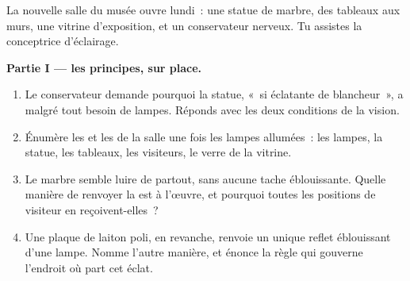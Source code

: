 \begin{problem}\label{pb:g7:light-sources-propagation:1}
La nouvelle salle du musée ouvre lundi~: une statue de marbre, des
tableaux aux murs, une vitrine d'exposition, et un conservateur
nerveux. Tu assistes la conceptrice d'éclairage.

\medskip\noindent\textbf{Partie I --- les principes, sur place.}
\begin{enumerate}
  \item Le conservateur demande pourquoi la statue, «~si
        éclatante de blancheur~», a malgré tout besoin de lampes.
        Réponds avec les deux conditions de la vision.
  \item Énumère les  et les  de
        la salle une fois les lampes allumées~: les lampes, la
        statue, les tableaux, les visiteurs, le verre de la
        vitrine.
  \item Le marbre semble luire de partout, sans aucune tache
        éblouissante. Quelle manière de renvoyer la  est à
        l'œuvre, et pourquoi toutes les positions de visiteur en
        reçoivent-elles~?
  \item Une plaque de laiton poli, en revanche, renvoie un unique
        reflet éblouissant d'une lampe. Nomme l'autre manière, et
        énonce la règle qui gouverne l'endroit où part cet éclat.
\end{enumerate}


\end{problem}
